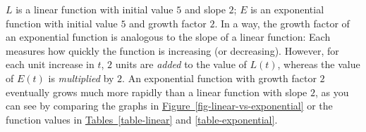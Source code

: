 \documentclass[10pt,]{book}
\theoremstyle{plain}
\theoremstyle{definition}
\theoremstyle{definition}
\theoremstyle{definition}
\theoremstyle{definition}
\theoremstyle{definition}
\numberwithin{equation}{section}
\begin{document}
    \(L\) is a linear function with initial value \(5\) and slope \(2\); \(E\) is an exponential function with initial value \(5\) and growth factor \(2\). In a way, the growth factor of an exponential function is analogous to the slope of a linear function: Each measures how quickly the function is increasing (or decreasing). However, for each unit increase in \(t\), \(2\) units are \emph{added} to the value of \(L(t)\), whereas the value of \(E(t)\) is \emph{multiplied} by \(2\). An exponential function with growth factor \(2\) eventually grows much more rapidly than a linear function with slope \(2\), as you can see by comparing the graphs in \hyperref[fig-linear-vs-exponential]{Figure~\ref{fig-linear-vs-exponential}} or the function values in  \hyperref[table-linear]{Tables~\ref{table-linear}} and \hyperref[table-exponential]{\ref{table-exponential}}.
%
\end{document}
